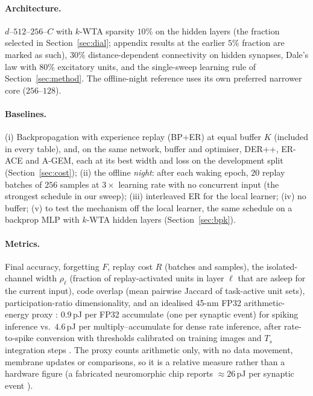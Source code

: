 \documentclass{article}
\newcommand{\kwta}{$k$-WTA}
\begin{document}
\paragraph{Architecture.}
$d$--$512$--$256$--$C$ with \kwta{} sparsity $10\%$ on the hidden layers (the fraction
selected in Section~\ref{sec:dial}; appendix results at the earlier $5\%$ fraction are marked
as such), $30\%$ distance-dependent connectivity on hidden synapses, Dale's law with $80\%$
excitatory units, and the single-sweep learning rule of Section~\ref{sec:method}. The
offline-night reference uses its own preferred narrower core ($256$--$128$).

\paragraph{Baselines.}
(i) Backpropagation with experience replay (BP+ER) at equal buffer $K$ (included in every
table), and, on the same network, buffer and optimiser, DER++, ER-ACE and A-GEM, each at its
best width and loss on the development split (Section~\ref{sec:cost});
(ii) the offline \emph{night}: after each waking epoch, $20$ replay batches of $256$ samples at
$3\times$ learning rate with no concurrent input (the strongest schedule in our sweep);
(iii) interleaved ER for the local learner; (iv) no buffer; (v) to test the mechanism off
the local learner, the same schedule on a backprop MLP with \kwta{} hidden layers
(Section~\ref{sec:bpk}).

\paragraph{Metrics.}
Final accuracy, forgetting $F$, replay cost $R$ (batches and samples), the isolated-channel width
$\rho_\ell$ (fraction of replay-activated units in layer $\ell$ that are asleep for the current
input), code overlap (mean pairwise Jaccard of task-active unit sets), participation-ratio
dimensionality, and an idealised 45-nm FP32 arithmetic-energy proxy \citep{horowitz2014}:
$0.9$\,pJ per FP32 accumulate (one per synaptic event) for spiking inference vs.\ $4.6$\,pJ
per multiply--accumulate for dense rate inference, after rate-to-spike conversion with thresholds
calibrated on training images and $T_s$ integration steps \citep{rueckauer2017}. The proxy
counts arithmetic only, with no data movement, membrane updates or comparisons, so it is a
relative measure rather than a hardware figure (a fabricated neuromorphic chip reports
$\approx26$\,pJ per synaptic event \citep{merolla2014convention}).
\end{document}
